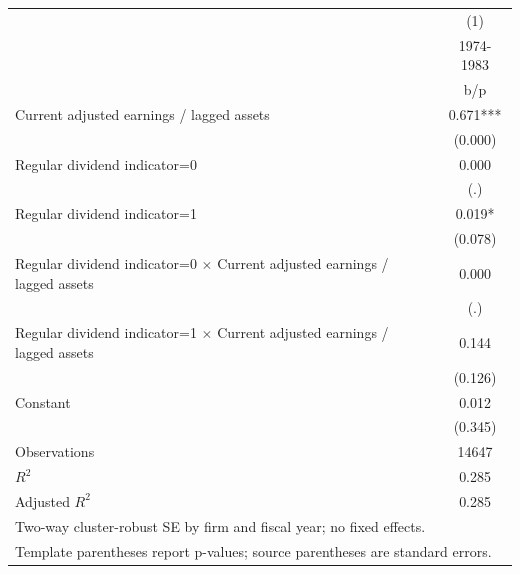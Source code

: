 {
\def\sym#1{\ifmmode^{#1}\else\(^{#1}\)\fi}
\begin{tabular}{l*{1}{c}}
\hline\hline
                    &\multicolumn{1}{c}{(1)}\\
                    &\multicolumn{1}{c}{1974-1983}\\
                    &         b/p   \\
\hline
Current adjusted earnings / lagged assets&       0.671***\\
                    &     (0.000)   \\
Regular dividend indicator=0&       0.000   \\
                    &         (.)   \\
Regular dividend indicator=1&       0.019*  \\
                    &     (0.078)   \\
Regular dividend indicator=0 $\times$ Current adjusted earnings / lagged assets&       0.000   \\
                    &         (.)   \\
Regular dividend indicator=1 $\times$ Current adjusted earnings / lagged assets&       0.144   \\
                    &     (0.126)   \\
Constant            &       0.012   \\
                    &     (0.345)   \\
\hline
Observations        &       14647   \\
\(R^{2}\)           &       0.285   \\
Adjusted \(R^{2}\)  &       0.285   \\
\hline\hline
\multicolumn{2}{l}{\footnotesize Two-way cluster-robust SE by firm and fiscal year; no fixed effects.}\\
\multicolumn{2}{l}{\footnotesize Template parentheses report p-values; source parentheses are standard errors.}\\
\end{tabular}
}
